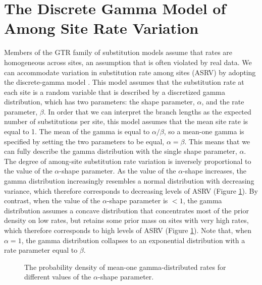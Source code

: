 \newpage
\section{The Discrete Gamma Model of Among Site Rate Variation}


Members of the GTR family of substitution models assume that rates are homogeneous across sites, an assumption that is often violated by real data.
We can accommodate variation in substitution rate among sites (ASRV) by adopting the discrete-gamma model \citep{yang94a}.
This model assumes that the substitution rate at each site is a random variable that is described by a discretized gamma distribution, which has two parameters: the shape parameter, $\alpha$, and the rate parameter, $\beta$. 
In order that we can interpret the branch lengths as the expected number of substitutions per site, this model assumes that the mean site rate is equal to 1.
The mean of the gamma is equal to $\alpha/\beta$, so a mean-one gamma is specified by setting the two parameters to be equal, $\alpha=\beta$.
This means that we can fully describe the gamma distribution with the single shape parameter, $\alpha$. 
The degree of among-site substitution rate variation is inversely proportional to the value of the $\alpha$-shape parameter.
As the value of the $\alpha$-shape increases, the gamma distribution increasingly resembles a normal distribution with decreasing variance, which therefore corresponds to decreasing levels of ASRV (Figure \ref{asrhGammaFig}).
By contrast, when the value of the $\alpha$-shape parameter is $< 1$, the gamma distribution assumes a concave distribution that concentrates most of the prior density on low rates, but retains some prior mass on sites with very high rates, which therefore corresponds to high levels of ASRV (Figure \ref{asrhGammaFig}).
Note that, when $\alpha = 1$, the gamma distribution collapses to an exponential distribution with a rate parameter equal to $\beta$.


\begin{figure}[h]
\centering
{}
\caption{\small The probability density of mean-one gamma-distributed rates for different values of the $\alpha$-shape parameter.}
\label{asrhGammaFig}
\end{figure}

